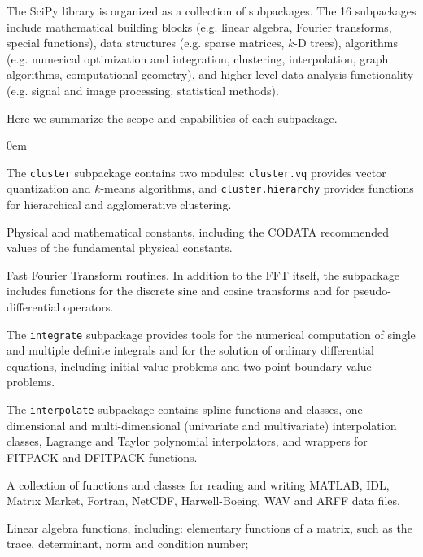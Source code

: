 The SciPy library is organized as a collection of subpackages.  The 16
subpackages include mathematical building blocks (e.g. linear algebra, Fourier
transforms, special functions), data structures (e.g. sparse matrices, $k$-D trees),
algorithms (e.g. numerical optimization and integration, clustering, interpolation,
graph algorithms, computational geometry), and higher-level data analysis
functionality (e.g. signal and image processing, statistical methods).

Here we summarize the scope and capabilities of each subpackage.

\begin{description}[leftmargin=!, labelwidth=\widthof{\bfseries \texttt{interpolate}}]
\itemsep0em
\item[\texttt{cluster}]
    The \texttt{cluster} subpackage contains two modules:
    \texttt{cluster.vq} provides vector quantization and $k$-means algorithms,
    and \texttt{cluster.hierarchy} provides functions for hierarchical and
    agglomerative clustering.
\item[\texttt{constants}]
    Physical and mathematical constants, including the CODATA recommended
    values of the fundamental physical constants\cite{CODATA2014}.
\item[\texttt{fftpack}]
    Fast Fourier Transform routines.  In addition to the FFT itself, the subpackage
    includes functions for the discrete sine and cosine transforms and for
    pseudo-differential operators.
\item[\texttt{integrate}]
    The \texttt{integrate} subpackage provides tools for the numerical
    computation of single and multiple definite integrals and for the
    solution of ordinary differential equations, including initial value
    problems and two-point boundary value problems.
\item[\texttt{interpolate}]
    The \texttt{interpolate} subpackage contains spline functions and
    classes, one-dimensional and multi-dimensional (univariate and
    multivariate) interpolation classes, Lagrange and Taylor polynomial
    interpolators, and wrappers for FITPACK and DFITPACK functions.
\item[\texttt{io}]
    A collection of functions and classes for reading and writing MATLAB, IDL,
    Matrix Market, Fortran, NetCDF, Harwell-Boeing, WAV and ARFF data files. 
\item[\texttt{linalg}]
    Linear algebra functions, including:
    elementary functions of a matrix, such as the trace, determinant, norm and
    condition number;

\end{description}
